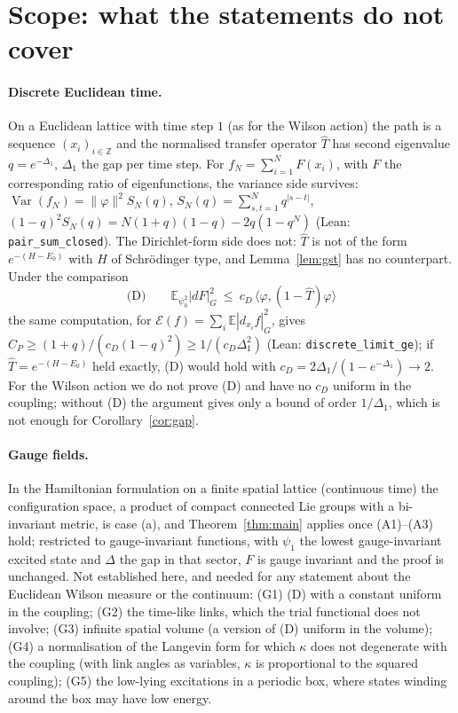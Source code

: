 \documentclass[11pt,a4paper]{article}
\theoremstyle{definition}
\theoremstyle{remark}
\newcommand{\E}{\mathbb{E}}
\newcommand{\Var}{\operatorname{Var}}
\newcommand{\cE}{\mathcal{E}}
\newcommand{\code}[1]{\texttt{#1}}
\begin{document}
\section{Scope: what the statements do not cover}\label{sec:scope}

\paragraph{Discrete Euclidean time.}
On a Euclidean lattice with time step $1$ (as for the Wilson action) the path is a sequence $(x_i)_{i\in\mathbb Z}$ and the normalised transfer operator $\hat T$ has second eigenvalue $q=e^{-\Delta_1}$, $\Delta_1$ the gap per time step.
For $f_N=\sum_{i=1}^NF(x_i)$, with $F$ the corresponding ratio of eigenfunctions, the variance side survives: $\Var(f_N)=\|\varphi\|^2S_N(q)$, $S_N(q)=\sum_{s,t=1}^Nq^{|s-t|}$, $(1-q)^2S_N(q)=N(1+q)(1-q)-2q(1-q^N)$ (Lean: \code{pair\_sum\_closed}).
The Dirichlet-form side does not: $\hat T$ is not of the form $e^{-(H-E_0)}$ with $H$ of Schr\"odinger type, and Lemma~\ref{lem:gst} has no counterpart.
Under the comparison
\[
  \text{(D)}\qquad \E_{\psi_0^2}|dF|^2_G\ \le\ c_D\,\bigl\langle\varphi,(1-\hat T)\varphi\bigr\rangle
\]
the same computation, for $\cE(f)=\sum_i\E|d_{x_i}f|^2_G$, gives $C_P\ge(1+q)/(c_D(1-q)^2)\ge1/(c_D\Delta_1^2)$ (Lean: \code{discrete\_limit\_ge}); if $\hat T=e^{-(H-E_0)}$ held exactly, (D) would hold with $c_D=2\Delta_1/(1-e^{-\Delta_1})\to2$.
For the Wilson action we do not prove (D) and have no $c_D$ uniform in the coupling; without (D) the argument gives only a bound of order $1/\Delta_1$, which is not enough for Corollary~\ref{cor:gap}.

\paragraph{Gauge fields.}
In the Hamiltonian formulation on a finite spatial lattice (continuous time) the configuration space, a product of compact connected Lie groups with a bi-invariant metric, is case (a), and Theorem~\ref{thm:main} applies once (A1)--(A3) hold; restricted to gauge-invariant functions, with $\psi_1$ the lowest gauge-invariant excited state and $\Delta$ the gap in that sector, $F$ is gauge invariant and the proof is unchanged.
Not established here, and needed for any statement about the Euclidean Wilson measure or the continuum: (G1) (D) with a constant uniform in the coupling; (G2) the time-like links, which the trial functional does not involve; (G3) infinite spatial volume (a version of (D) uniform in the volume); (G4) a normalisation of the Langevin form for which $\kappa$ does not degenerate with the coupling (with link angles as variables, $\kappa$ is proportional to the squared coupling); (G5) the low-lying excitations in a periodic box, where states winding around the box may have low energy.
\end{document}
